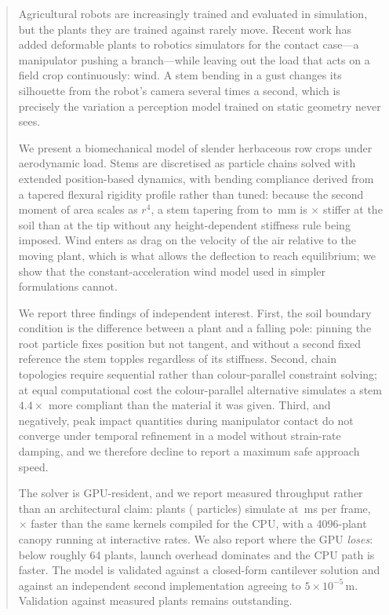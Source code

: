 \documentclass[conference]{IEEEtran}
\begin{document}
\begin{abstract}
Agricultural robots are increasingly trained and evaluated in simulation, but
the plants they are trained against rarely move. Recent work has added
deformable plants to robotics simulators for the contact case---a manipulator
pushing a branch---while leaving out the load that acts on a field crop
continuously: wind. A stem bending in a gust changes its silhouette from the
robot's camera several times a second, which is precisely the variation a
perception model trained on static geometry never sees.

We present a biomechanical model of slender herbaceous row crops under
aerodynamic load. Stems are discretised as particle chains solved with
extended position-based dynamics, with bending compliance derived from a
tapered flexural rigidity profile rather than tuned: because the second moment
of area scales as $r^4$, a stem tapering from \RadiusBase{} to \RadiusTip{}\,mm
is \RigidityRatio{}$\times$ stiffer at the soil than at the tip without any
height-dependent stiffness rule being imposed. Wind enters as drag on the
velocity of the air relative to the moving plant, which is what allows the
deflection to reach equilibrium; we show that the constant-acceleration wind
model used in simpler formulations cannot.

We report three findings of independent interest. First, the soil boundary
condition is the difference between a plant and a falling pole: pinning the
root particle fixes position but not tangent, and without a second fixed
reference the stem topples regardless of its stiffness. Second, chain
topologies require sequential rather than colour-parallel constraint solving;
at equal computational cost the colour-parallel alternative simulates a stem
$4.4\times$ more compliant than the material it was given. Third, and
negatively, peak impact quantities during manipulator contact do not converge
under temporal refinement in a model without strain-rate damping, and we
therefore decline to report a maximum safe approach speed.

The solver is GPU-resident, and we report measured throughput rather than an
architectural claim: \BenchMaxPlants{} plants (\BenchMaxParticles{}
particles) simulate at \BenchWarpCUDA{}\,ms per frame, \Speedup{}$\times$
faster than the same kernels compiled for the CPU, with a 4096-plant canopy
running at interactive rates. We also report where the GPU \emph{loses}:
below roughly 64 plants, launch overhead dominates and the CPU path is
faster. The model is validated against a closed-form cantilever solution and
against an independent second implementation agreeing to
$5\times10^{-5}$\,m. Validation against measured plants remains
outstanding.
\end{abstract}
\end{document}
